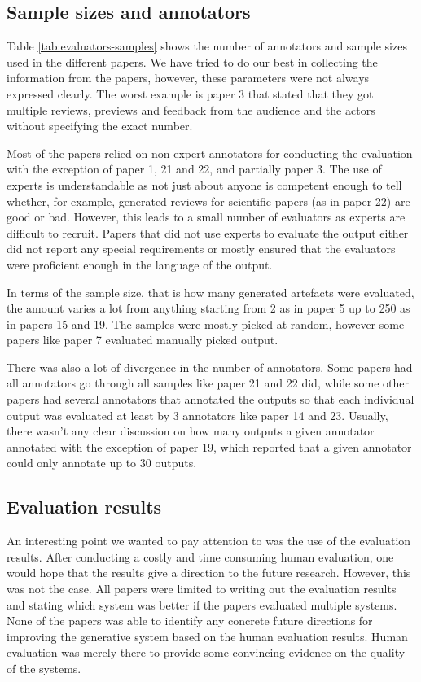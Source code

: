 \documentclass[11pt,a4paper]{article}
\begin{document}
\subsection{Sample sizes and annotators}

Table \ref{tab:evaluators-samples} shows the number of annotators and sample sizes used in the different papers. We have tried to do our best in collecting the information from the papers, however, these parameters were not always expressed clearly. The worst example is paper 3 that stated that they got multiple reviews, previews and feedback from the audience and the actors without specifying the exact number.



Most of the papers relied on non-expert annotators for conducting the evaluation with the exception of paper 1, 21 and 22, and partially paper 3. The use of experts is understandable as not just about anyone is competent enough to tell whether, for example, generated reviews for scientific papers (as in paper 22) are good or bad. However, this leads to a small number of evaluators as experts are difficult to recruit. Papers that did not use experts to evaluate the output either did not report any special requirements or mostly ensured that the evaluators were proficient enough in the language of the output.

In terms of the sample size, that is how many generated artefacts were evaluated, the amount varies a lot from anything starting from 2 as in paper 5 up to 250 as in papers 15 and 19. The samples were mostly picked at random, however some papers like paper 7 evaluated manually picked output.

There was also a lot of divergence in the number of annotators. Some papers had all annotators go through all samples like paper 21 and 22 did, while some other papers had several annotators that annotated the outputs so that each individual output was evaluated at least by 3 annotators like paper 14 and 23. Usually, there wasn't any clear discussion on how many outputs a given annotator annotated with the exception of paper 19, which reported that a given annotator could only annotate up to 30 outputs.

\subsection{Evaluation results}

An interesting point we wanted to pay attention to was the use of the evaluation results. After conducting a costly and time consuming human evaluation, one would hope that the results give a direction to the future research. However, this was not the case. All papers were limited to writing out the evaluation results and stating which system was better if the papers evaluated multiple systems. None of the papers was able to identify any concrete future directions for improving the generative system based on the human evaluation results. Human evaluation was merely there to provide some convincing evidence on the quality of the systems.
\end{document}
